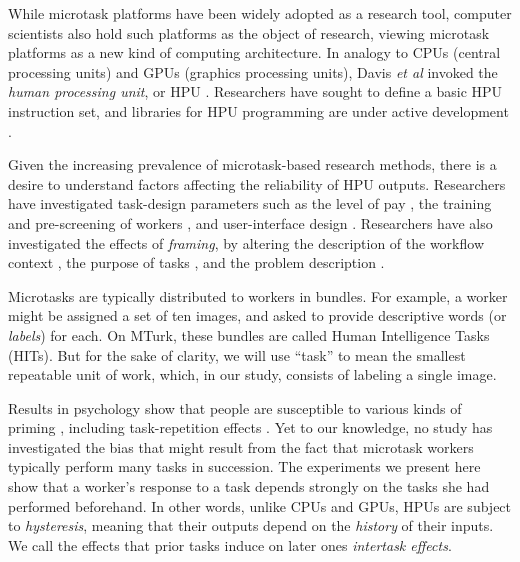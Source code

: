 \documentclass[12pt]{article}
\begin{document}
While microtask platforms have been widely adopted as a research tool,
computer scientists also hold such platforms as the object of 
research, viewing  microtask platforms as a new kind of computing 
architecture.  In analogy to CPUs (central 
processing units) and GPUs (graphics processing units), 
Davis \textit{et al} invoked the \textit{human processing unit}, or HPU \cite{5543192}.
Researchers have sought to define a basic HPU instruction set, and
libraries for HPU programming are under active development
 \cite{little2010turkit,minder2011crowdlang,minder2012crowdlang,kittur2011crowdforge}.  

Given the increasing prevalence of microtask-based research methods, there
is a desire to understand factors affecting the reliability of HPU
outputs.  Researchers have investigated task-design parameters such as the 
level of pay \cite{kazai2013analysis}, the training and pre-screening of 
workers \cite{le2010ensuring,paolacci2010running}, and user-interface 
design \cite{Finnerty2013}.  
Researchers have also investigated the effects of \textit{framing}, 
by altering the description of the workflow context 
\cite{Kinnaird2012281}, the purpose of tasks 
\cite{chandler2013breaking}, and the problem description
\cite{thibodeau2013natural}.  

Microtasks are typically distributed to workers in bundles.  For example, a 
worker might be assigned a set of ten images, and asked to provide 
descriptive words (or \textit{labels}) for each.  
On MTurk, these bundles are called Human Intelligence Tasks (HITs).
But for the sake of clarity, we will use ``task'' to mean the smallest 
repeatable unit of work, which, in our study, consists of labeling a single
image.

Results in psychology show that people are susceptible to various kinds of 
priming \cite{BJOP1796,No2007,beller1971priming}, including 
task-repetition effects \cite{Gass1999549,sohn2001task}.  
Yet to our knowledge, no study has investigated the bias that might
result from the fact that microtask workers typically perform many tasks in 
succession.  The experiments we present here show that a worker's response 
to a task depends strongly on the tasks she had performed beforehand.
In other words, unlike CPUs and GPUs, HPUs are subject to 
\textit{hysteresis}, meaning that their outputs depend on the 
\textit{history} of their inputs.
We call the effects that prior tasks induce on later ones 
\textit{intertask effects}.    
\end{document}
